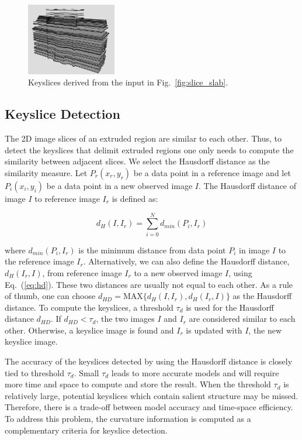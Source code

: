 \documentclass[review]{acmsiggraph}       %
\newcommand{\Eq}[1] {Eq.~(\ref{eq:#1})}
\newcommand{\Fig}[1]{Fig.~\ref{fig:#1}}
\begin{document}
\begin{figure}[hbtp]
\centering
\includegraphics[width=0.35\textwidth]{figures/keyslice_wireframe.png}
\caption{Keyslices derived from the input in \Fig{slice_slab}.}
\label{fig:keyslices}
\end{figure}

\subsection{Keyslice Detection}
\label{sec:ksd}
The 2D image slices of an extruded region are similar to each other.
Thus, to detect the keyslices that delimit extruded regions one only needs
to compute the similarity between adjacent slices.
We select the Hausdorff distance as the similarity measure.
Let $P_r(x_r, y_r)$ be a data point in a reference image and
let $P_i(x_i, y_i)$ be a data point in a new observed image $I$.
The Hausdorff distance of image $I$ to reference image $I_r$ is defined as:

\begin{equation}
d_H(I, I_r) = \sum_{i=0}^Nd_{min}(P_i, I_r)
\label{eq:hd}
\end{equation}

where $d_{min}(P_i, I_r)$ is the minimum distance from data point $P_i$
in image $I$ to the reference image $I_r$.
Alternatively, we can also define the Hausdorff distance, $d_H(I_r, I)$,
from reference image $I_r$ to a new observed image $I$, using \Eq{hd}.
These two distances are usually not equal to each other.
As a rule of thumb, one can choose
$d_{HD} = \text{MAX}\{d_H(I, I_r), d_H(I_r, I)\}$ as the Hausdorff distance.
To compute the keyslices, a threshold $\tau_{d}$ is used for the
Hausdorff distance $d_{HD}$.
If $d_{HD} < \tau_{d}$, the two images $I$ and $I_r$ are considered
similar to each other.
Otherwise, a keyslice image is found and $I_r$ is updated with $I$,
the new keyslice image.

The accuracy of the keyslices detected by using the Hausdorff distance
is closely tied to threshold $\tau_d$.
Small $\tau_d$ leads to more accurate models and will require more time and
space to compute and store the result.
When the threshold $\tau_d$ is relatively large, potential keyslices which
contain salient structure may be missed.
Therefore, there is a trade-off between model accuracy and time-space
efficiency.
To address this problem, the curvature information is computed as a
complementary criteria for keyslice detection.
\end{document}
